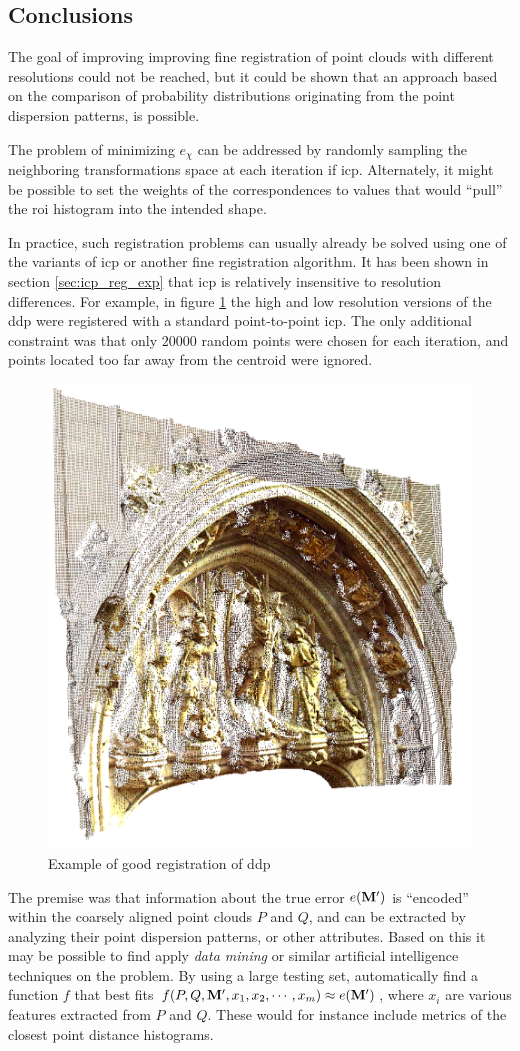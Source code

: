 \subsection{Conclusions}
The goal of improving improving fine registration of point clouds with different resolutions could not be reached, but it could be shown that an approach based on the comparison of probability distributions originating from the point dispersion patterns, is possible.

The problem of minimizing $e_{\chi}$ can be addressed by randomly sampling the neighboring transformations space at each iteration if \gls{icp}. Alternately, it might be possible to set the weights of the correspondences to values that would ``pull'' the \gls{roi} histogram into the intended shape.

In practice, such registration problems can usually already be solved using one of the variants of \gls{icp} or another fine registration algorithm. It has been shown in section \ref{sec:icp_reg_exp} that \gls{icp} is relatively insensitive to resolution differences. For example, in figure \ref{fig:ddp_good} the high and low resolution versions of the \gls{ddp} were registered with a standard point-to-point \gls{icp}. The only additional constraint was that only $20000$ random points were chosen for each iteration, and points located too far away from the centroid were ignored.

\begin{figure}[h]
\centering
\includegraphics[width=.5\textwidth]{fig/ddp_icp_good.png}
\caption{Example of good registration of \gls{ddp}}
\label{fig:ddp_good}
\end{figure}

The premise was that information about the true error $e(\mathbf{M'})$ is ``encoded'' within the coarsely aligned point clouds $P$ and $Q$, and can be extracted by analyzing their point dispersion patterns, or other attributes. Based on this it may be possible to find apply \emph{data mining} or similar artificial intelligence techniques on the problem. By using a large testing set, automatically find a function $f$ that best fits $f(P, Q, \mathbf{M'}, x_1, x_2, \cdots, x_m) \approx e(\mathbf{M'})$, where $x_i$ are various features extracted from $P$ and $Q$. These would for instance include metrics of the closest point distance histograms.
